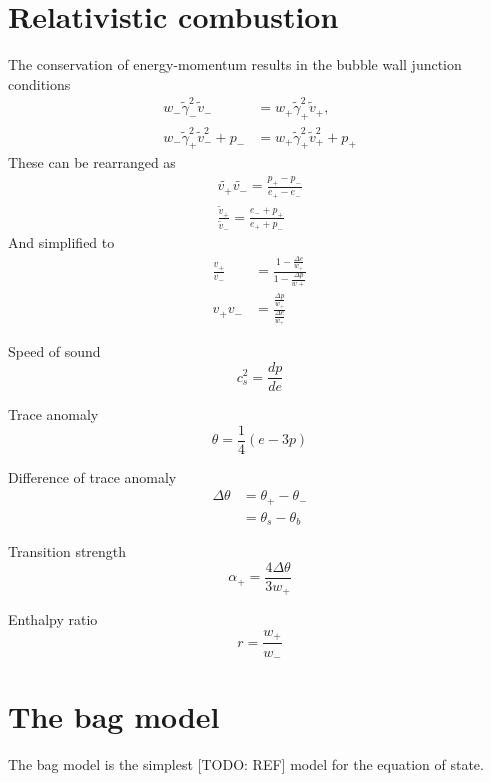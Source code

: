 \section{Relativistic combustion}
The conservation of energy-momentum results in the bubble wall junction conditions
\begin{align}
w_- \tilde{\gamma}_-^2 \tilde{v}_- &= w_+ \tilde{\gamma}_+^2 \tilde{v}_+, \\
w_- \tilde{\gamma}_+^2 \tilde{v}_-^2 + p_- &= w_+ \tilde{\gamma}_+^2 \tilde{v}_+^2 + p_+
\end{align}
These can be rearranged as
\cites[eq. 7.32]{lecture_notes}[eq. 6-7]{giese_2020}
\begin{align}
\tilde{v_+} \tilde{v_-} = \frac{p_+ - p_-}{e_+ - e_-} \\
\frac{\tilde{v}_+}{\tilde{v}_-} = \frac{e_- + p_+}{e_+ + p_-}
\end{align}
And simplified to
\begin{align}
\frac{v_+}{v_-} &= \frac{1 - \frac{\Delta e}{w_+}}{1 - \frac{\Delta p}{w+}} \\
v_+ v_- &= \frac{\frac{\Delta p}{w_+}}{\frac{\Delta e}{w_+}}
\end{align}

Speed of sound
\cite[eq. 13]{giese_2020}
\begin{equation}
c_s^2 = \frac{dp}{de}
\end{equation}

Trace anomaly
\begin{equation}
\theta = \frac{1}{4}(e-3p)
\end{equation}

Difference of trace anomaly
\begin{align}
\Delta \theta
&= \theta_+ - \theta_- \\
&= \theta_s - \theta_b
\end{align}

Transition strength
\begin{equation}
\alpha_+ = \frac{4 \Delta \theta}{3 w_+}
\end{equation}

Enthalpy ratio
\begin{equation}
r = \frac{w_+}{w_-}
\end{equation}


\section{The bag model}
The bag model is the simplest [TODO: REF] model for the equation of state.


